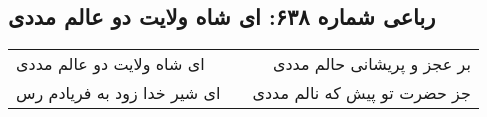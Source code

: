 \begin{center}
\section*{رباعی شماره ۶۳۸: ای شاه ولایت دو عالم مددی}
\label{sec:sh638}
\begin{longtable}{l p{0.5cm} r}
ای شاه ولایت دو عالم مددی
&&
بر عجز و پریشانی حالم مددی
\\
ای شیر خدا زود به فریادم رس
&&
جز حضرت تو پیش که نالم مددی
\\
\end{longtable}
\end{center}
